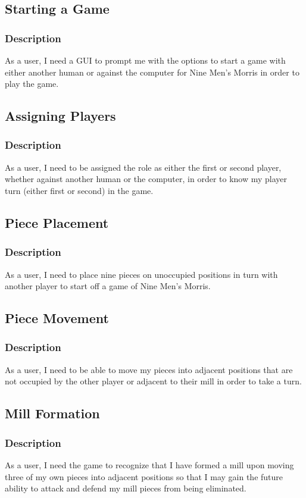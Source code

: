 \documentclass[11pt]{article}
\begin{document}
\subsection{Starting a Game}
\label{sec:org0591b29}
\subsubsection*{Description}
\label{sec:orgeb39229}
As a user, I need a GUI to prompt me with the options to start a game with either another human
or against the computer for Nine Men's Morris in order to play the game.
\subsection{Assigning Players}
\label{sec:org935843e}
\subsubsection*{Description}
\label{sec:orgef420f4}
As a user, I need to be assigned the role as either the first or second player, whether against
another human or the computer, in order to know my player turn (either first or second) in the
game.
\subsection{Piece Placement}
\label{sec:orga4c2085}
\subsubsection*{Description}
\label{sec:org95cd271}
As a user, I need to place nine pieces on unoccupied positions in turn with another player to
start off a game of Nine Men's Morris.
\subsection{Piece Movement}
\label{sec:org67107d5}
\subsubsection*{Description}
\label{sec:orgc612300}
As a user, I need to be able to move my pieces into adjacent positions that are not occupied by
the other player or adjacent to their mill in order to take a turn.
\subsection{Mill Formation}
\label{sec:org2525b34}
\subsubsection*{Description}
\label{sec:orga5d6947}
As a user, I need the game to recognize that I have formed a mill upon moving three of my own
pieces into adjacent positions so that I may gain the future ability to attack and defend my
mill pieces from being eliminated.
\end{document}
